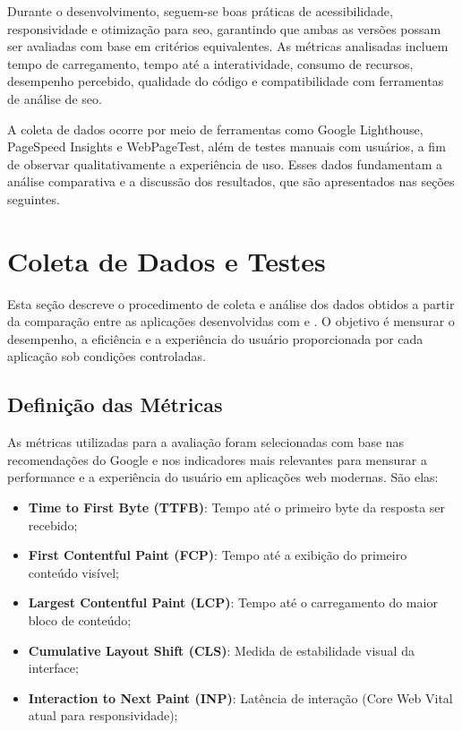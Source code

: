 Durante o desenvolvimento, seguem-se boas práticas de acessibilidade, responsividade e otimização para \acrshort{seo}, garantindo que ambas as versões possam ser avaliadas com base em critérios equivalentes. As métricas analisadas incluem tempo de carregamento, tempo até a interatividade, consumo de recursos, desempenho percebido, qualidade do código e compatibilidade com ferramentas de análise de \acrshort{seo}.

A coleta de dados ocorre por meio de ferramentas como Google Lighthouse, PageSpeed Insights e WebPageTest, além de testes manuais com usuários, a fim de observar qualitativamente a experiência de uso. Esses dados fundamentam a análise comparativa e a discussão dos resultados, que são apresentados nas seções seguintes.

\section{Coleta de Dados e Testes}
\label{sec:coleta-de-dados-e-testes}

Esta seção descreve o procedimento de coleta e análise dos dados obtidos a partir da comparação entre as aplicações desenvolvidas com  e . O objetivo é mensurar o desempenho, a eficiência e a experiência do usuário proporcionada por cada aplicação sob condições controladas.

\subsection{Definição das Métricas}

As métricas utilizadas para a avaliação foram selecionadas com base nas recomendações do Google e nos indicadores mais relevantes para mensurar a performance e a experiência do usuário em aplicações web modernas. São elas:

\begin{itemize}
    \item \textbf{Time to First Byte (TTFB)}: Tempo até o primeiro byte da resposta ser recebido;
    \item \textbf{First Contentful Paint (FCP)}: Tempo até a exibição do primeiro conteúdo visível;
    \item \textbf{Largest Contentful Paint (LCP)}: Tempo até o carregamento do maior bloco de conteúdo;
    \item \textbf{Cumulative Layout Shift (CLS)}: Medida de estabilidade visual da interface;
    \item \textbf{Interaction to Next Paint (INP)}: Latência de interação (Core Web Vital atual para responsividade);
\end{itemize}

